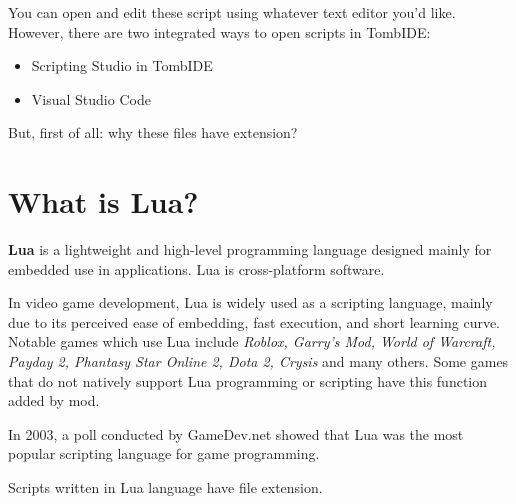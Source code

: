 You can open and edit these script using whatever text editor you'd like. However, there are two integrated ways to open scripts in TombIDE:
\begin{itemize}
    \item Scripting Studio in TombIDE
    \item Visual Studio Code
\end{itemize}

But, first of all: why these files have  extension?

\section{What is Lua?}

\textbf{Lua} is a lightweight and high-level programming language designed mainly for embedded use in applications. Lua is cross-platform software.

\par In video game development, Lua is widely used as a scripting language, mainly due to its perceived ease of embedding, fast execution, and short learning curve. Notable games which use Lua include \emph{Roblox, Garry's Mod, World of Warcraft, Payday 2, Phantasy Star Online 2, Dota 2, Crysis} and many others. Some games that do not natively support Lua programming or scripting have this function added by mod.

\par In 2003, a poll conducted by GameDev.net showed that Lua was the most popular scripting language for game programming. \cite{LUA_Wikipedia}

\par Scripts written in Lua language have  file extension.


